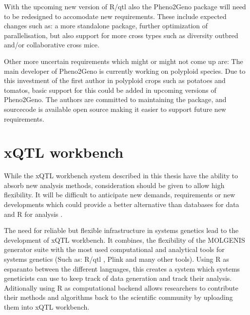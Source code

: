 With the upcoming new version of R/qtl also the Pheno2Geno package will need to be redesigned 
to accomodate new requirements. These include expected changes such as: a more standalone package, 
further optimization of parallelisation, but also support for more cross types such as 
diversity outbred and/or collaborative cross mice. 

Other more uncertain requirements which might or might not come up are: The main developer 
of Pheno2Geno is currently working on polyploid species. Due to this investment of the first 
author in polyploid crops such as potatoes and tomatos, basic support for this could be added 
in upcoming versions of Pheno2Geno. The authors are committed to maintaining the package, 
and sourcecode is available open source making it easier to support future new requirements.

\section{xQTL workbench}
\label{sect:xQTLworkbench}
While the xQTL workbench system described in this thesis have the ability to absorb new 
analysis methods, consideration should be given to allow high flexibility. It will be 
difficult to anticipate new demands, requirements or new developments which could provide 
a better alternative than databases for data and R for analysis \cite{Arends:2012}.

The need for reliable but flexible infrastructure in systems genetics lead to the development of 
xQTL workbench. It combines, the flexibility of the MOLGENIS generator suite \cite{Swertz:2010b} 
with the most used computational and analytical tools for systems genetics (Such as: R/qtl 
\cite{Broman:2003, Arends:2010}, Plink \cite{Purcell:2007} and many other tools). Using R as 
esparanto between the different languages, this creates a system which systems geneticists can 
use to keep track of data generation and track their analysis. Aditionally using R as computational 
backend allows researchers to contribute their methods and algorithms back to the scientific 
community by uploading them into xQTL workbench.

